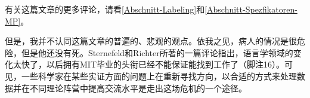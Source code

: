 {{  有关这篇文章的更多评论，请看\ref{Abschnitt-Labeling}和\ref{Abschnitt-Spezfikatoren-MP}。
}

但是，我并不认同这篇文章的普遍的、悲观的观点。依我之见，病人的情况是很危险，但是他还没有死。Sternefeld和Richter所著的一篇评论指出，语言学领域的变化太快了，以后拥有MIT毕业的头衔已经不能保证能找到工作了（脚注16）。可见，一些科学家在某些实证方面的问题上在重新寻找方向，以合适的方式来处理数据并在不同理论阵营中提高交流水平是走出这场危机的一个途径。

}
